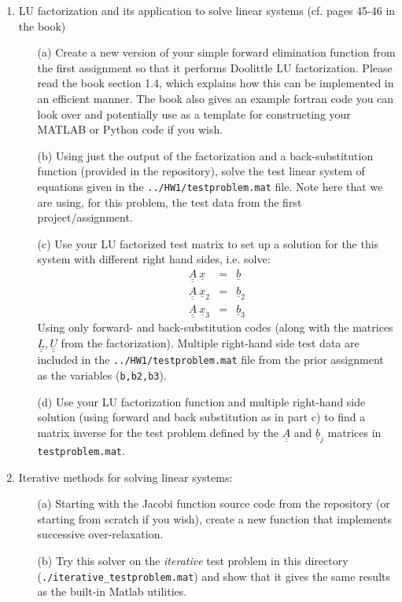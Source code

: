 \documentclass{article}
\begin{document}
\begin{enumerate}
  \item LU factorization and its application to solve linear systems (cf. pages 45-46 in the book)
  \begin{itemize}
    \item[(a)] Create a new version of your simple forward elimination function from the first assignment so that it performs Doolittle LU factorization.  Please read the book section 1.4, which explains how this can be implemented in an efficient manner.  The book also gives an example fortran code you can look over and potentially use as a template for constructing your MATLAB or Python code if you wish.  
    \item[(b)] Using just the output of the factorization and a back-substitution function (provided in the repository), solve the test linear system of equations given in the \texttt{../HW1/testproblem.mat} file.  Note here that we are using, for this problem, the test data from the first project/assignment.  
    \item[(c)] Use your LU factorized test matrix to set up a solution for the this system with different right hand sides, i.e. solve:
    \begin{eqnarray}
      \underline{\underline{A}} ~\underline{x} &=& \underline{b} \\
      \underline{\underline{A}} ~\underline{x}_2 &=& \underline{b}_2 \\
      \underline{\underline{A}} ~\underline{x}_3 &=& \underline{b}_3    
    \end{eqnarray}   
    Using only forward- and back-substitution codes (along with the matrices $\underline{\underline{L}}, \underline{\underline{U}}$ from the factorization).  Multiple right-hand side test data are included in the \texttt{../HW1/testproblem.mat} file from the prior assignment as the variables (\texttt{b,b2,b3}).
    \item[(d)] Use your LU factorization function and multiple right-hand side solution (using forward and back substitution as in part c) to find a matrix inverse for the test problem defined by the $\underline{\underline{A}}$ and  $\underline{b}_j$ matrices in \texttt{testproblem.mat}.  
  \end{itemize}
  
  
  \item Iterative methods for solving linear systems:  
  \begin{itemize}
    \item[(a)] Starting with the Jacobi function source code from the repository (or starting from scratch if you wish), create a new function that implements successive over-relaxation.  
    \item[(b)] Try this solver on the \emph{iterative} test problem in this directory (\texttt{./iterative\_testproblem.mat}) and show that it gives the same results as the built-in Matlab utilities. 
  \end{itemize}  
\end{enumerate}
\end{document}
